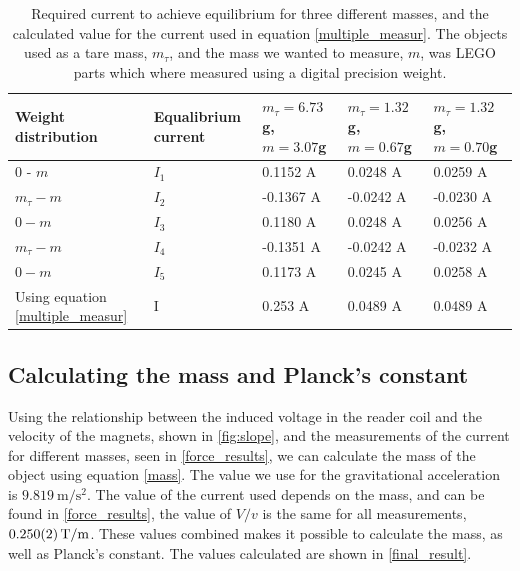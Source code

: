 \documentclass[english,a4paper,12pt,reprint]{revtex4-1}
\begin{document}
\begin{table}
\centering
\caption{Required current to achieve equilibrium for three different masses, and the calculated value for the current used in equation \eqref{multiple_measur}. The objects used as a tare mass, $m_\tau$, and the mass we wanted to measure, $m$, was LEGO parts which where measured using a digital precision weight.}
\label{force_results}
\begin{tabular}{@{}lllll@{}}
\toprule
Weight distribution & Equalibrium current & $m_\tau = 6.73$g, $m=3.07$g & $m_\tau = 1.32$g, $m=0.67$g & $m_\tau = 1.32$g, $m=0.70$g \\ \midrule
0 - $m$  & $I_1$           & 0.1152 A                    & 0.0248 A                    & 0.0259 A                    \\
$m_\tau - m$   & $I_2$     & -0.1367 A                   & -0.0242 A                   & -0.0230 A                   \\
$0 - m$      & $I_3$        & 0.1180 A                    & 0.0248 A                   & 0.0256 A                    \\
$m_\tau - m$  & $I_4$       & -0.1351 A                   & -0.0242 A                   & -0.0232 A                   \\
$0-m$        &$I_5$       & 0.1173 A                    & 0.0245 A                    & 0.0258 A    \\ \midrule Using equation \eqref{multiple_measur} & I & 0.253 A & 0.0489 A & 0.0489 A \\ \bottomrule
\end{tabular}
\end{table}

\subsection{Calculating the mass and Planck's constant}
Using the relationship between the induced voltage in the reader coil and the velocity of the magnets, shown in \eqref{fig:slope}, and the measurements of the current for different masses, seen in \vref{force_results}, we can calculate the mass of the object using equation \eqref{mass}. The value we use for the gravitational acceleration is $\SI{9.819}{\meter/\second^2}$. The value of the current used depends on the mass, and can be found in \vref{force_results}, the value of $V/v$ is the same for all measurements, $\SI{0.250\pm0.002}{\tesla/\meter}$. These values combined makes it possible to calculate the mass, as well as Planck's constant. The values calculated are shown in \vref{final_result}. %
\end{document}

